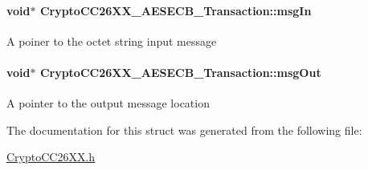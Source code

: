 \paragraph[{msg\+In}]{\setlength{\rightskip}{0pt plus 5cm}void$\ast$ Crypto\+C\+C26\+X\+X\+\_\+\+A\+E\+S\+E\+C\+B\+\_\+\+Transaction\+::msg\+In}\label{struct_crypto_c_c26_x_x___a_e_s_e_c_b___transaction_ac63701080bffd789b53c7effcf46cfe9}
A poiner to the octet string input message 
\paragraph[{msg\+Out}]{\setlength{\rightskip}{0pt plus 5cm}void$\ast$ Crypto\+C\+C26\+X\+X\+\_\+\+A\+E\+S\+E\+C\+B\+\_\+\+Transaction\+::msg\+Out}\label{struct_crypto_c_c26_x_x___a_e_s_e_c_b___transaction_ab5c3bff547308f1a63c771349cbef069}
A pointer to the output message location 

The documentation for this struct was generated from the following file\+:\begin{DoxyCompactItemize}
\item 
\hyperlink{_crypto_c_c26_x_x_8h}{Crypto\+C\+C26\+X\+X.\+h}\end{DoxyCompactItemize}

